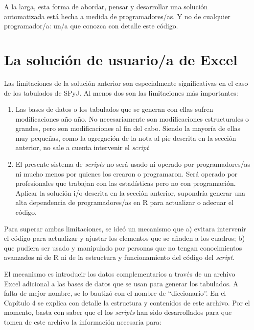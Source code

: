 \documentclass[
  spanish,
]{book}
\begin{document}
A la larga, esta forma de abordar, pensar y desarrollar una solución automatizada está hecha a medida de programadores/as. Y no de cualquier programador/a: un/a que conozca con detalle este código.

\hypertarget{la-soluciuxf3n-de-usuarioa-de-excel}{%
\section{La solución de usuario/a de Excel}\label{la-soluciuxf3n-de-usuarioa-de-excel}}

Las limitaciones de la solución anterior son especialmente significativas en el caso de los tabulados de SPyJ. Al menos dos son las limitaciones más importantes:

\begin{enumerate}
\def\labelenumi{\arabic{enumi}.}
\item
  Las bases de datos o los tabulados que se generan con ellas sufren modificaciones año año. No necesariamente son modificaciones estructurales o grandes, pero son modificaciones al fin del cabo. Siendo la mayoría de ellas muy pequeñas, como la agregación de la nota al pie descrita en la sección anterior, no sale a cuenta intervenir el \emph{script}
\item
  El presente sistema de \emph{scripts} no será usado ni operado por programadores/as ni mucho menos por quienes los crearon o programaron. Será operado por profesionales que trabajan con las estadísticas pero no con programación. Aplicar la solución i/o descrita en la sección anterior, supondría generar una alta dependencia de programadores/as en R para actualizar o adecuar el código.
\end{enumerate}

Para superar ambas limitaciones, se ideó un mecanismo que a) evitara intervenir el código para actualizar y ajustar los elementos que se añaden a los cuadros; b) que pudiera ser usado y manipulado por personas que no tengan conocimientos avanzados ni de R ni de la estructura y funcionamiento del código del \emph{script}.

El mecanismo es introducir los datos complementarios a través de un archivo Excel adicional a las bases de datos que se usan para generar los tabulados. A falta de mejor nombre, se lo bautizó con el nombre de ``diccionario''. En el Capítulo 4 se explica con detalle la estructura y contenidos de este archivo. Por el momento, basta con saber que el los \emph{scripts} han sido desarrollados para que tomen de este archivo la información necesaria para:
\end{document}
